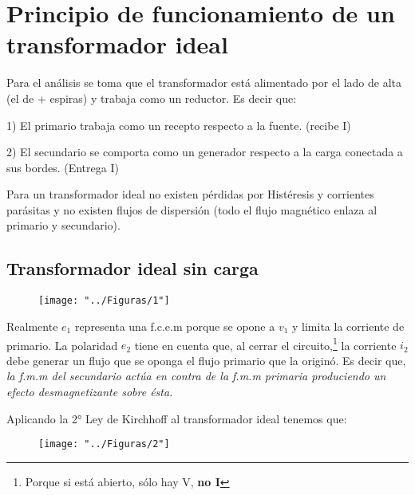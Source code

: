 \fancyfoot{}
\fancyhead{}
\setlength{\headsep}{1.2cm}

\setlength{\parindent}{0pt}%



\section{Principio de funcionamiento de un transformador ideal}

Para el análisis se toma que el transformador está alimentado por el lado de alta (el de + espiras) y trabaja como un reductor. Es decir que:

1) El primario trabaja como un recepto respecto a la fuente. (recibe I)

2) El secundario se comporta como un generador respecto a la carga conectada a sus bordes. (Entrega I)

Para un transformador ideal no existen pérdidas por Histéresis y corrientes parásitas y no existen flujos de dispersión (todo el flujo magnético enlaza al primario y secundario).

\subsection{Transformador ideal sin carga}
\begin{figure}[!htbp]
	\centering
	\texttt{[image: "../Figuras/1"]}
\end{figure} 
 
 Realmente $e_{1}$ representa una f.c.e.m porque se opone a $v_{1}$ y limita la corriente de primario. La polaridad $e_{2}$ tiene en cuenta que, al cerrar el circuito,\footnote{Porque si está abierto, sólo hay V, \textbf{no I}} la corriente $i_{2}$ debe generar un flujo que se oponga el flujo primario que la originó. Es decir que, \textit{la f.m.m del secundario actúa en contra de la f.m.m primaria produciendo un efecto desmagnetizante sobre ésta.}
 
 Aplicando la 2° Ley de Kirchhoff al transformador ideal tenemos que:
 
 \begin{figure}[!htbp]
 	\centering
 	\texttt{[image: "../Figuras/2"]}
 	\label{fig:voltaje}
 \end{figure} 


